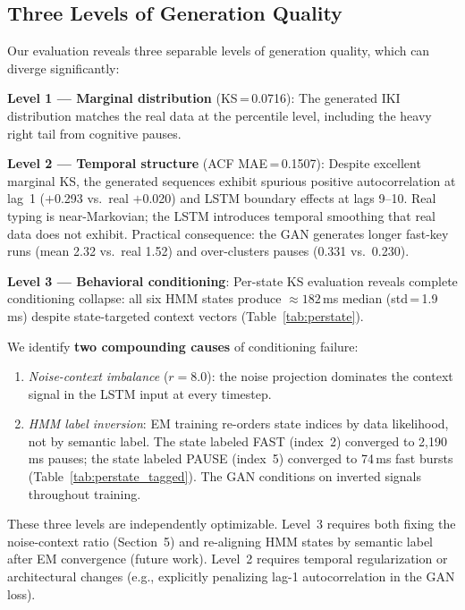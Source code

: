 \documentclass[sigconf,nonacm]{acmart}
\begin{document}
\subsection{Three Levels of Generation Quality}

Our evaluation reveals three separable levels of generation quality,
which can diverge significantly:

\textbf{Level 1 --- Marginal distribution} (KS\,=\,0.0716):
The generated IKI distribution matches the real data at the percentile
level, including the heavy right tail from cognitive pauses.

\textbf{Level 2 --- Temporal structure} (ACF MAE\,=\,0.1507):
Despite excellent marginal KS, the generated sequences exhibit spurious
positive autocorrelation at lag~1 ($+$0.293 vs.\ real $+$0.020) and
LSTM boundary effects at lags 9--10.
Real typing is near-Markovian; the LSTM introduces temporal smoothing
that real data does not exhibit.
Practical consequence: the GAN generates longer fast-key runs (mean 2.32
vs.\ real 1.52) and over-clusters pauses (0.331 vs.\ 0.230).

\textbf{Level 3 --- Behavioral conditioning}:
Per-state KS evaluation reveals complete conditioning collapse: all six
HMM states produce $\approx\!182$\,ms median (std\,=\,1.9\,ms) despite
state-targeted context vectors (Table~\ref{tab:perstate}).

We identify \textbf{two compounding causes} of conditioning failure:
\begin{enumerate}
  \item \emph{Noise-context imbalance} ($r\!=\!8.0$): the noise projection
    dominates the context signal in the LSTM input at every timestep.
  \item \emph{HMM label inversion}: EM training re-orders state indices
    by data likelihood, not by semantic label.
    The state labeled FAST (index~2) converged to 2{,}190\,ms pauses;
    the state labeled PAUSE (index~5) converged to 74\,ms fast bursts
    (Table~\ref{tab:perstate_tagged}).
    The GAN conditions on inverted signals throughout training.
\end{enumerate}

These three levels are independently optimizable.
Level~3 requires both fixing the noise-context ratio (Section~5) and
re-aligning HMM states by semantic label after EM convergence (future work).
Level~2 requires temporal regularization or architectural changes
(e.g., explicitly penalizing lag-1 autocorrelation in the GAN loss).
\end{document}

